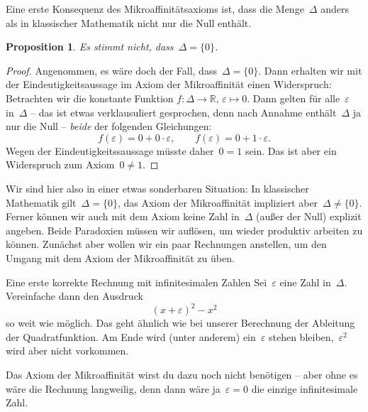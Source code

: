 \documentclass[twoside]{../zirkelblatt}
\newcommand{\RR}{\mathbb{R}}
\theoremstyle{definition}
\theoremstyle{plain}
\newtheorem{prop}[defn]{Proposition}
\theoremstyle{remark}
\begin{document}
Eine erste Konsequenz des Mikroaffinitätsaxioms ist, dass die Menge~$\Delta$
anders als in klassischer Mathematik nicht nur die Null enthält.
\begin{prop}\label{prop:neg-delta0}Es stimmt nicht, dass~$\Delta = \{ 0 \}$.\end{prop}
\begin{proof}Angenommen, es wäre doch der Fall, dass~$\Delta = \{ 0 \}$. Dann
erhalten wir mit der Eindeutigkeitsaussage im Axiom der Mikroaffinität einen
Widerspruch: Betrachten wir die konstante Funktion $f : \Delta \to \RR,\,\varepsilon \mapsto 0$.
Dann gelten für alle~$\varepsilon$ in~$\Delta$ -- das ist etwas verklausuliert
gesprochen, denn nach Annahme enthält~$\Delta$ ja nur die Null -- \emph{beide}
der folgenden Gleichungen:
\[
  f(\varepsilon) = 0 + 0 \cdot \varepsilon, \qquad
  f(\varepsilon) = 0 + 1 \cdot \varepsilon. \]
Wegen der Eindeutigkeitssaussage müsste daher~$0 = 1$ sein. Das ist aber ein
Widerspruch zum Axiom~$0 \neq 1$.
\end{proof}

Wir\marginpar[\hfill\dbend]{\dbend} sind hier also in einer etwas sonderbaren Situation: In klassischer
Mathematik gilt~$\Delta = \{ 0 \}$, das Axiom der Mikroaffinität impliziert
aber~$\Delta \neq \{ 0 \}$. Ferner können wir auch mit dem Axiom keine Zahl
in~$\Delta$ (außer der Null) explizit angeben. Beide Paradoxien müssen wir
auflösen, um wieder produktiv arbeiten zu können. Zunächst aber wollen wir ein
paar Rechnungen anstellen, um den Umgang mit dem Axiom der Mikroaffinität zu
üben.

\begin{aufgabeShaded}{Eine erste korrekte Rechnung mit infinitesimalen Zahlen}
\label{aufg:erste-rechnung}
Sei~$\varepsilon$ eine Zahl in~$\Delta$. Vereinfache dann den Ausdruck
\[ (x + \varepsilon)^2 - x^2 \]
so weit wie möglich. Das geht ähnlich wie bei unserer Berechnung der Ableitung
der Quadratfunktion. Am Ende wird (unter anderem) ein~$\varepsilon$ stehen
bleiben,~$\varepsilon^2$ wird aber nicht vorkommen.

Das Axiom der Mikroaffinität wirst du dazu noch nicht benötigen -- aber ohne es
wäre die Rechnung langweilig, denn dann wäre ja~$\varepsilon = 0$ die einzige
infinitesimale Zahl.
\end{aufgabeShaded}
\end{document}
